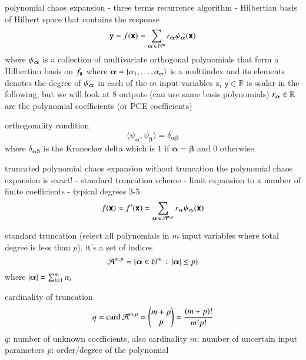polynomial chaos expansion
- three terms recurrence algorithm \cite{feinberg_chaospy_2015}
- Hilbertian basis of Hilbert space that contains the response \cite{sudret_global_2008}
\begin{equation}
    \mathsf{y} = f(\boldsymbol{\mathsf{x}}) = \sum_{{\bm{\alpha}} \,\in\, \mathbb{N}^m} r_{{\bm{\alpha}}} \psi_{{\bm{\alpha}}}(\boldsymbol{\mathsf{x}})
\end{equation}
where $\psi_{\bm{\alpha}}$ is a collection of multivariate orthogonal polynomials that form a Hilbertian basis on $f_{\boldsymbol{\mathsf{x}}}$
where ${\bm{\alpha}} = \{\alpha_1,\dots,\alpha_m\}$ is a multiindex and its elements
denotes the degree of $\psi_{\bm{\alpha}}$ in each of the $m$ input variables $\mathsf{x}_i$
$\mathsf{y}\in\mathbb{R}$ is scalar in the following, but we will look at 8 outputs (can use same basis polynomials)
$r_{\bm{\alpha}} \in \mathbb{R}$ are the polynomial coefficients (or PCE coefficients)

orthogonality condition
\begin{equation}
    \langle \psi_{\bm\alpha}, \psi_{\bm\beta} \rangle = \delta_{\bm{\alpha\beta}}
\end{equation}
where $\delta_{\bm{\alpha\beta}}$ is the Kronecker delta which is $1$ if $\bm\alpha=\bm\beta$ and $0$ otherwise.

truncated polynomial chaos expansion
without truncation the polynomial chaos expansion is exact! \cite{fajraoui_optimal_2017}
- standard truncation scheme \cite{gratiet_metamodel-based_2015,sudret_global_2008}
- limit expansion to a number of finite coefficients
- typical degrees 3-5 \cite{gratiet_metamodel-based_2015}
\begin{equation}
    f(\boldsymbol{\mathsf{x}}) \approx f'(\boldsymbol{\mathsf{x}}) = \sum_{{\bm{\alpha}} \,\in\, \mathcal{A}^{m,p}} r_{\bm{\alpha}} \psi_{\bm{\alpha}}(\boldsymbol{\mathsf{x}})
\end{equation}

standard truncation (select all polynomials in $m$ input variables where total degree is less than $p$), it's a set of indices
\begin{equation}
    \mathcal{A}^{m,p} = \left\{{\bm{\alpha}} \in \mathbb{N}^m \,:\, \left|{\bm{\alpha}}\right| \leq p\right\}
\end{equation}
where $\left|{\bm{\alpha}}\right| = \sum_{i=1}^m \alpha_i$

cardinality of truncation
\begin{equation}
    q = \text{card}\, \mathcal{A}^{m,p} = \left(\begin{matrix}
        m+p \\
        p
    \end{matrix}\right) = \frac{(m+p)!}{m!p!}
\end{equation}
$q$: number of unknown coefficients, also cardinality
$m$: number of uncertain input parameters
$p$: order/degree of the polynomial

